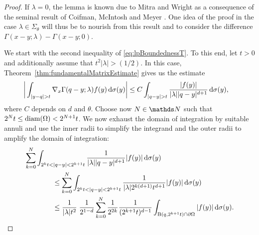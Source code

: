 \begin{proof}
  If $\lambda = 0$, the lemma is known due to Mitra and Wright \cite{mitreaWright} as a consequence of the seminal result of Coifman, McIntosh and Meyer \cite{coifman}.
  One idea of the proof in the case $\lambda \in \Sigma_\theta$ will thus be to nourish from this result and to consider the difference $\Gamma(x - y; \lambda) - \Gamma(x - y; 0)$.

  We start with the second inequality of \eqref{eq:lpBoundednessT}.
  To this end, let $t > 0$ and additionally assume that $t^2 |\lambda| > ({1}/{2})$. 
  In this case, Theorem~\ref{thm:fundamentalMatrixEstimate} gives us the estimate
  \begin{align*}
    \bigg| \int_{|y - q| > t} \nabla_x \Gamma(q - y; \lambda) f(y) \, {\operatorname{d}\!{\sigma}}(y) \bigg|
    &\leq C \int_{|q - y| > t} \frac{|f(y)|}{|\lambda| |q - y|^{d + 1}} \, {\operatorname{d}\!{\sigma}}(y) ,
  \end{align*}
  where $C$ depends on $d$ and $\theta$.
  Choose now $N \in \N$ such that $2^N t \leq \operatorname{diam}(\Omega) < 2^{N + 1} t$.
  We now exhaust the domain of integration by suitable annuli and use the inner radii to simplify the integrand and the outer radii to amplify the domain of integration:
  \begin{align}
    &\sum_{k = 0}^N \int_{2^k t < |q - y| < 2^{k + 1}t}  \frac{1}{|\lambda| |q - y|^{d + 1}} |f(y)| \, {\operatorname{d}\!{\sigma}}(y) \nonumber\\
    &\qquad\qquad\leq \sum_{k = 0}^N \int_{2^k t < |q - y| < 2^{k + 1}t}  \frac{1}{|\lambda| 2^{k(d + 1)}t^{d + 1}} |f(y)| \, {\operatorname{d}\!{\sigma}}(y) \nonumber\\
    &\qquad\qquad\leq \frac{1}{|\lambda|t^2}\; \frac{1}{2^{1 -d}}\sum_{k = 0}^N \frac{1}{2^{2k}} \frac{1}{(2^{k+1} t)^{d - 1}} \int_{\mathrm{B}(q, 2^{k + 1}t) \cap \partial \Omega}  |f(y)| \, {\operatorname{d}\!{\sigma}}(y)\label{eq:gtt}.
  \end{align}

\end{proof}
